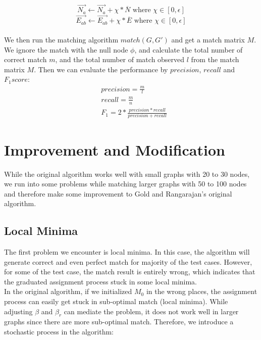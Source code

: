 \begin{equation} 
\overrightarrow{N_{a}} \leftarrow \overrightarrow{N_{a}}  + \chi*\overline{N} \text{ where } \chi \in [0,\epsilon]
\end{equation}
\begin{equation} 
\overrightarrow{E_{ab}} \leftarrow \overrightarrow{E_{ab}}  + \chi*\overline{E} \text{ where } \chi \in [0,\epsilon]
\end{equation}\\

We then run the matching algorithm $match(G,G')$ and get a match matrix $M$. We ignore the match with the null node $\phi$, and calculate the total number of correct match $m$, and the total number of match observed $l$ from the match matrix $M$. Then we can evaluate the performance by $precision$, $recall$ and $F_1 score$:
\begin{align} 
& precision = \frac{m}{l}\\
& recall = \frac{m}{n}\\
& F_1 =2*\frac{precision*recall}{precision+recall}
\end{align}

\section{Improvement and Modification}

While the original algorithm works well with small graphs with 20 to 30 nodes, we run into some problems while matching larger graphs with 50 to 100 nodes and therefore make some improvement to Gold and Rangarajan's original algorithm.

\subsection{Local Minima}

The first problem we encounter is local minima. In this case, the algorithm will generate correct and even perfect match for majority of the test cases. However, for some of the test case, the match result is entirely wrong, which indicates that the graduated assignment process stuck in some local minima.\\

In the original algorithm, if we initialized $M_0$ in the wrong places, the assignment process can easily get stuck in sub-optimal match (local minima). While adjusting $\beta$ and $\beta_r$ can mediate the problem, it does not work well in larger graphs since there are more sub-optimal match. Therefore, we introduce a stochastic process in the algorithm:

